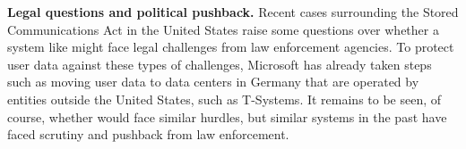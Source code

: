 
\textbf{Legal questions and political pushback.} Recent cases surrounding
the Stored Communications Act in the United States raise some questions over
whether a system like \system{} might face legal challenges from law
enforcement agencies. To protect user data against these types of challenges,
Microsoft has already taken steps such as moving user data to data centers in
Germany that are operated by entities outside the United States, such as
T-Systems. It remains to be seen, of course, whether \system{} would face similar
hurdles, but similar systems in the past have faced scrutiny and pushback from law
enforcement.
